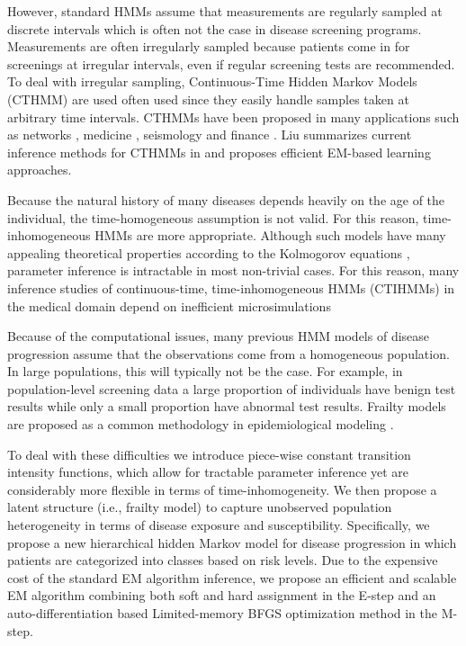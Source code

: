 \documentclass{article}
\begin{document}
However, standard HMMs assume that measurements are regularly sampled at discrete intervals which is often not the case in disease screening programs. Measurements are often irregularly sampled because patients come in for screenings at irregular intervals, even if regular screening tests are recommended.
To deal with irregular sampling, Continuous-Time Hidden Markov Models (CTHMM) are used often used since they easily handle samples taken at arbitrary time intervals. CTHMMs have been proposed in many applications such as networks \cite{Wei_2002}, medicine \cite{Bureau_2003}, seismology \cite{Lu_2017} and finance \cite{Krishnamurthy_2016}.  Liu summarizes current inference methods for CTHMMs in \cite{Liu_2015} and proposes efficient EM-based learning approaches. 

Because the natural history of many diseases depends heavily on the age of the individual, the time-homogeneous assumption is not valid.  For this reason, time-inhomogeneous HMMs are more appropriate.  Although such models have many appealing theoretical properties according to the Kolmogorov equations \cite{Zeifman_1994}, parameter inference is intractable in most non-trivial cases. For this reason, many inference studies of continuous-time, time-inhomogeneous HMMs (CTIHMMs) in the medical domain depend on inefficient microsimulations \cite{Sonnernberg_1993,Myers_2000,Canfell_2004}

Because of the computational issues, many previous HMM models of disease progression assume that the observations come from a homogeneous population. In large populations, this will typically not be the case. For example, in population-level screening data a large proportion of individuals have benign test results while only a small proportion have abnormal test results. Frailty models are proposed as a common methodology in epidemiological modeling \citep{Amy2010}.

To deal with these difficulties we introduce piece-wise constant transition intensity functions, which allow for tractable parameter inference yet are considerably more flexible in terms of time-inhomogeneity.  We then propose a latent structure (i.e., frailty model) to capture unobserved population heterogeneity in terms of disease exposure and susceptibility.  Specifically, we propose a new hierarchical hidden Markov model for disease progression in which patients are categorized into classes based on risk levels. Due to the expensive cost of the standard EM algorithm inference, we propose an efficient and scalable EM algorithm combining both soft and hard assignment in the E-step and an auto-differentiation based Limited-memory BFGS optimization method in the M-step. 
\end{document}
